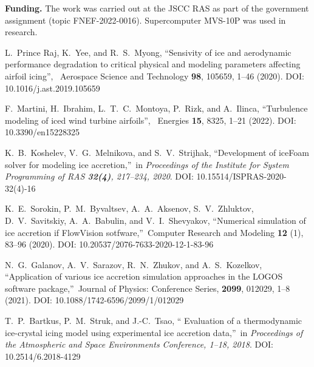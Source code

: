 \documentclass[
11pt,
tightenlines,
twoside,
onecolumn,
nofloats,
nobibnotes,
nofootinbib,
superscriptaddress,
noshowpacs,
centertags]
{revtex4}
\begin{document}
{\bf Funding.} The work was carried out at the JSCC RAS as part of
the government assignment (topic FNEF-2022-0016). Supercomputer
MVS-10P was used in research.


\begin{thebibliography}{99}

 L.~Prince Raj, K.~Yee, and R.~S.~Myong,
\textquotedblleft Sensivity of  ice and aerodynamic performance
degradation to critical physical and modeling parameters affecting
airfoil icing\textquotedblright, \ Aerospace Science and Technology
{\bf 98}, 105659, 1--46 (2020). DOI: 10.1016/j.ast.2019.105659

 F.~Martini, H.~Ibrahim, L.~T.~C.~Montoya, P.~Rizk,
and A.~Ilinca, \textquotedblleft Turbulence  modeling of iced wind
turbine airfoils\textquotedblright, \ Energies {\bf 15}, 8325, 1--21
(2022). DOI: 10.3390/en15228325

 K.~B.~Koshelev, V.~G.~Melnikova, and S.~V.~Strijhak,
\textquotedblleft Development of iceFoam  solver for modeling ice
accretion,\textquotedblright \ in \textit{Proceedings of the
Institute for System Programming of RAS {\bf 32(4)}, 217--234, 2020}. DOI: 10.15514/ISPRAS-2020-32(4)-16

 K.~E.~Sorokin, P.~M.~Byvaltsev, A.~A.~Aksenov,
S.~V.~Zhluktov, D.~V.~Savitskiy, A.~A.~Babulin,  and
V.~I.~Shevyakov, \textquotedblleft Numerical simulation of ice
accretion if FlowVision sotfware,\textquotedblright \ Computer
Research and Modeling {\bf 12} (1), 83--96 (2020). DOI: 10.20537/2076-7633-2020-12-1-83-96

N.~G.~Galanov, A.~V.~Sarazov, R.~N.~Zhukov, and A.~S.~Kozelkov, \textquotedblleft Application of various ice accretion simulation approaches in the LOGOS software package,\textquotedblright \ Journal of Physics: Conference Series, {\bf 2099}, 012029, 1--8 (2021). DOI: 10.1088/1742-6596/2099/1/012029

T.~P.~Bartkus, P.~M.~Struk, and J.-C.~Tsao, \textquotedblleft
Evaluation of  a thermodynamic ice-crystal icing model using
experimental ice accretion data,\textquotedblright \ in
\textit{Proceedings of the Atmospheric and Space Environments
Conference, 1--18, 2018}. DOI: 10.2514/6.2018-4129


\end{thebibliography}
\end{document}
